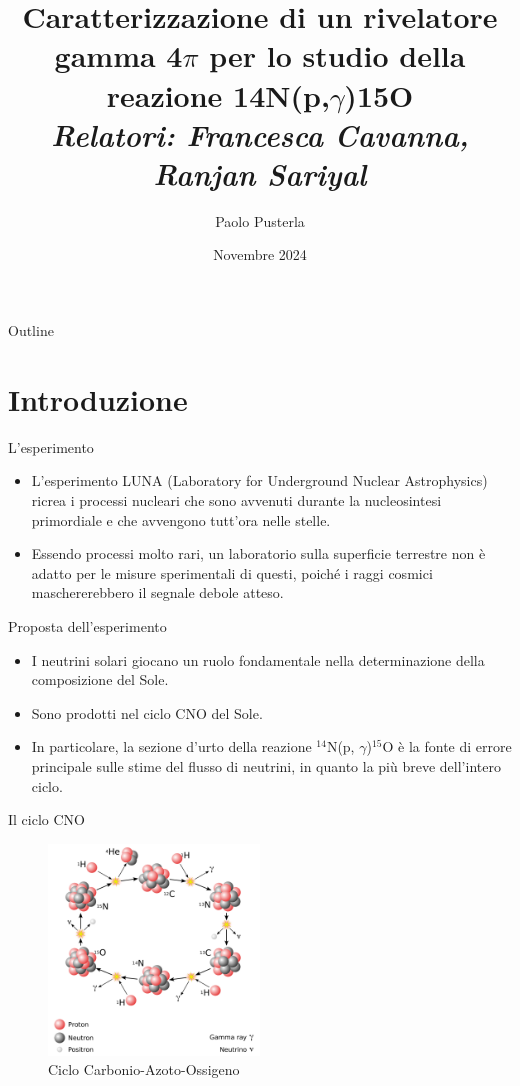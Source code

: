 \documentclass [xcolor=svgnames] {beamer}
\title[Short Title]{Caratterizzazione di un rivelatore gamma 4$\pi$ per lo studio della reazione 14N(p,$\gamma$)15O \\ \textit{Relatori: Francesca Cavanna, Ranjan Sariyal}}
\author[P. Pusterla]{Paolo Pusterla}
\institute[UniTo]{Università degli Studi di Torino}
\date{Novembre 2024}
\begin{document}
	
	\begin{frame}
		\titlepage
	\end{frame}
	
	\begin{frame}{Outline}
		\tableofcontents
	\end{frame}
	
	\section{Introduzione}
	\begin{frame}{L'esperimento}
		\begin{itemize}
			\item<1-> L'esperimento LUNA (Laboratory for Underground Nuclear Astrophysics) ricrea i processi nucleari che sono avvenuti durante la nucleosintesi primordiale e che avvengono tutt'ora nelle stelle.
			\item<2-> Essendo processi molto rari, un laboratorio sulla superficie terrestre non è adatto per le misure sperimentali di questi, poiché i raggi cosmici maschererebbero il segnale debole atteso.
		\end{itemize}
	\end{frame}
	
	
	\begin{frame}{Proposta dell'esperimento}
		\begin{itemize}
			\item<1-> I neutrini solari giocano un ruolo fondamentale nella determinazione della composizione del Sole.
			\item<2-> Sono prodotti nel ciclo CNO del Sole.
			\item<3-> In particolare, la sezione d'urto della reazione $^{14}$N(p, $\gamma$)$^{15}$O è la fonte di errore principale sulle stime del flusso di neutrini, in quanto la più breve dell'intero ciclo.
		\end{itemize}
	\end{frame}
		
	\begin{frame}{Il ciclo CNO}
		\begin{figure}[H]
			\includegraphics[width=0.5\textwidth]{img/CNO_Cycle.pdf}
			\caption{Ciclo Carbonio-Azoto-Ossigeno}
		\end{figure}
	\end{frame}
	
\end{document}
